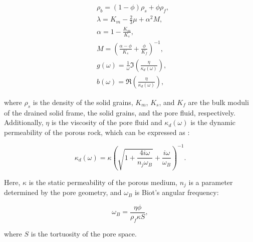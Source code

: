 \documentclass[draft]{agujournal2019}
\begin{document}
\begin{linenomath*}
\begin{equation}\label{Eq.3}
\begin{split}
& \rho_b =(1-\phi)\rho_s + \phi \rho_f, \\
& \lambda= K_m - \frac{2}{3} \mu + \alpha^2 M, \\
& \alpha =1-\frac{K_m}{K_s},\\
& M  =\left( \frac{\alpha-\phi}{K_s} +\frac{\phi}{K_f} \right)^{-1}, \\
& g(\omega) =  \frac{1}{\omega} \Im \left( \frac{\eta}{\kappa_d(\omega)} \right),\\
& b(\omega) = \Re\left( \frac{\eta}{\kappa_d(\omega)} \right),
\end{split}
\end{equation}
\end{linenomath*}
where $\rho_s$ is the density of the solid grains, $K_m$, $K_s$, and $K_f$ are the bulk moduli of the drained solid frame, the solid grains, and the pore fluid, respectively. Additionally, $\eta$ is the viscosity of the pore fluid and $\kappa_d(\omega)$ is the dynamic permeability of the porous rock, which can be expressed as \cite{Johnson1987}:
\begin{linenomath*}
\begin{equation}\label{Eq.4}
    \kappa_d(\omega)=\kappa \left(\sqrt{1 + \frac{4 i \omega}{n_j \omega_B} }+ \frac{i \omega}{\omega_B}   \right) ^{-1}.
\end{equation}
\end{linenomath*}
Here, $\kappa$ is the static permeability of the porous medium, $n_j$ is a parameter determined by the pore geometry, and $\omega_B$ is Biot's angular frequency:
\begin{linenomath*}
\begin{equation}\label{Eq.5}
  \omega_B = \frac{\eta \phi}{\rho_f \kappa S},
\end{equation}
\end{linenomath*}
where $S$ is the tortuosity of the pore space. 
\end{document}
